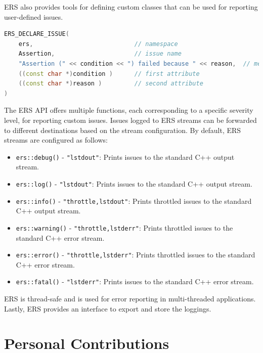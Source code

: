\acs{ERS} also provides tools for defining custom classes that can be used for reporting user-defined issues. 

\begin{lstlisting}[language=C++, caption={ERS Assertion Issue Declaration}, label={lst:ers_assertion_issue}]
ERS_DECLARE_ISSUE(
    ers,                            // namespace
    Assertion,                      // issue name
    "Assertion (" << condition << ") failed because " << reason,  // message
    ((const char *)condition )      // first attribute
    ((const char *)reason )         // second attribute
)
\end{lstlisting}

The \acs{ERS} \acs{API} offers multiple functions, each corresponding to a specific severity level, for reporting custom issues. Issues logged to \acs{ERS} streams can be forwarded to different destinations based on the stream configuration. By default, \acs{ERS} streams are configured as follows:

\begin{itemize}
    \item \texttt{ers::debug()} - \texttt{"lstdout"}: Prints issues to the standard C++ output stream.
    \item \texttt{ers::log()} - \texttt{"lstdout"}: Prints issues to the standard C++ output stream.
    \item \texttt{ers::info()} - \texttt{"throttle,lstdout"}: Prints throttled issues to the standard C++ output stream.
    \item \texttt{ers::warning()} - \texttt{"throttle,lstderr"}: Prints throttled issues to the standard C++ error stream.
    \item \texttt{ers::error()} - \texttt{"throttle,lstderr"}: Prints throttled issues to the standard C++ error stream.
    \item \texttt{ers::fatal()} - \texttt{"lstderr"}: Prints issues to the standard C++ error stream.
\end{itemize}

\acs{ERS} is thread-safe and is used for error reporting in multi-threaded applications.\\
Lastly, \acs{ERS} provides an interface to export and store the loggings.

\clearpage
\section{Personal Contributions}


